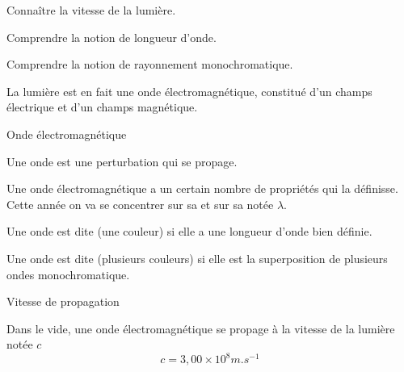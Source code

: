 \teteSndLumi

\vspace*{-32pt}


\begin{objectifs}
  \item Connaître la vitesse de la lumière.
  \item Comprendre la notion de longueur d'onde.
  \item Comprendre la notion de rayonnement monochromatique.
\end{objectifs}

\begin{contexte}
  La lumière est en fait une onde électromagnétique, constitué d'un champs électrique et d'un champs magnétique.
  
\end{contexte}


\begin{doc}{Onde électromagnétique}
  \vspace*{-24pt}
  \begin{encart}
    Une onde est une perturbation qui se propage.
  \end{encart}
  
  Une onde électromagnétique a un certain nombre de propriétés qui la définisse.
  Cette année on va se concentrer sur sa  et sur sa  notée $\lambda$.
  
  \begin{encart}
    Une onde est dite  (une couleur) si elle a une longueur d'onde bien définie.
    
    Une onde est dite  (plusieurs couleurs) si elle est la superposition de plusieurs ondes monochromatique.
  \end{encart}
\end{doc}

\begin{doc}{Vitesse de propagation}
  \vspace*{-24pt}
  \begin{encart}
    Dans le vide, une onde électromagnétique se propage à la vitesse de la lumière notée $c$
    \begin{equation*}
      c = 3,\!00 \times 10^8 \unit{m.s}^{-1}
    \end{equation*}
  \end{encart}
\end{doc}

